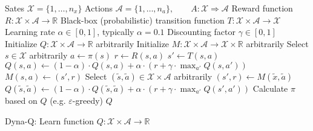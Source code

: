 \documentclass{article}
\begin{document}
\begin{preview}
    \begin{algorithm}[H]
        \begin{algorithmic}
        \Require
        \Statex Sates $\mathcal{X} = \{1, \dots, n_x\}$
        \Statex Actions $\mathcal{A} = \{1, \dots, n_a\},\qquad A: \mathcal{X} \Rightarrow \mathcal{A}$
        \Statex Reward function $R: \mathcal{X} \times \mathcal{A} \rightarrow \mathbb{R}$
        \Statex Black-box (probabilistic) transition function $T: \mathcal{X} \times \mathcal{A} \rightarrow \mathcal{X}$
        \Statex Learning rate $\alpha \in [0, 1]$, typically $\alpha = 0.1$
        \Statex Discounting factor $\gamma \in [0, 1]$
            \State Initialize $Q: \mathcal{X} \times \mathcal{A} \rightarrow \mathbb{R}$ arbitrarily
            \State Initialize $M: \mathcal{X} \times \mathcal{A} \rightarrow \mathcal{X} \times \mathbb{R}$ arbitrarily 
                \State Select $s \in \mathcal{X}$ arbitrarily
                \State $a \gets \pi(s)$ 
                \State $r \gets R(s, a)$ 
                \State $s' \gets T(s, a)$ 
                \State $Q(s, a) \gets (1 - \alpha) \cdot Q(s, a) + \alpha \cdot (r + \gamma \cdot \max_{a'} Q(s, a'))$
                \State $M(s, a) \gets (s', r)$
                    \State Select $(\tilde{s}, \tilde{a}) \in \mathcal{X} \times \mathcal{A}$ arbitrarily
                    \State $(s', r) \gets M(\tilde{x}, \tilde{a})$
                    \State $Q(\tilde{s}, \tilde{a}) \gets (1 - \alpha) \cdot Q(\tilde{s}, \tilde{a}) + \alpha \cdot (r + \gamma \cdot \max_{a'} Q(s', a'))$
                \EndFor
                \State Calculate $\pi$ based on $Q$ (e.g. $\varepsilon$-greedy)
            \EndWhile
            \Return $Q$
        \EndProcedure
        \end{algorithmic}
    \caption{Dyna-Q: Learn function $Q: \mathcal{X} \times \mathcal{A} \rightarrow \mathbb{R}$}
    \label{alg:dyna-q}
    \end{algorithm}
\end{preview}
\end{document}
